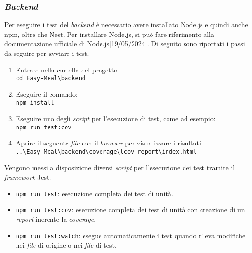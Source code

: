 \subsubsection{\textit{Backend}}
Per eseguire i test del \textit{backend} è necessario avere installato Node.js e quindi anche npm, oltre che Nest. 
Per installare Node.js, si può fare riferimento alla documentazione ufficiale di \href{https://nodejs.org/en/download/package-manager}{Node.js}[19/05/2024]. 
Di seguito sono riportati i passi da seguire per avviare i test.
\begin{enumerate}
	\item Entrare nella cartella del progetto: \\
		\texttt{cd Easy-Meal\textbackslash backend}
	\item Eseguire il comando: \\
		\texttt{npm install}
	\item Eseguire uno degli \textit{script} per l'esecuzione di test, come ad esempio: \\
		\texttt{npm run test:cov}
	\item Aprire il seguente \textit{file} con il \textit{browser} per visualizzare i risultati: \\
		\texttt{..\textbackslash Easy-Meal\textbackslash backend\textbackslash coverage\textbackslash lcov-report\textbackslash index.html}
\end{enumerate}
Vengono messi a disposizione diversi \textit{script} per l'esecuzione dei test tramite il \textit{framework} Jest:
\begin{itemize}
	\item \texttt{npm run test}: esecuzione completa dei test di unità.
	\item \texttt{npm run test:cov}: esecuzione completa dei test di unità con creazione di un \textit{report} inerente la \textit{coverage}.
	\item \texttt{npm run test:watch}: esegue automaticamente i test quando rileva modifiche nei \textit{file} di origine o nei \textit{file} di test.
\end{itemize}

